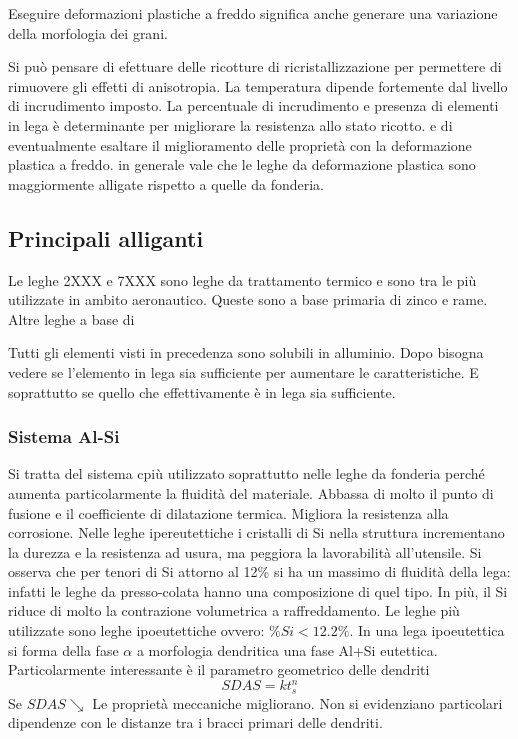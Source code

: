 
Eseguire deformazioni plastiche a freddo significa anche generare una variazione della morfologia dei grani.

Si può pensare di efettuare delle ricotture di ricristallizzazione per permettere di rimuovere gli effetti di anisotropia.
La temperatura dipende fortemente dal livello di incrudimento imposto.
La percentuale di incrudimento e presenza di elementi in lega è determinante per migliorare la resistenza allo stato ricotto. e di eventualmente esaltare il miglioramento delle proprietà con la deformazione plastica a freddo.
in generale vale che le leghe da deformazione plastica sono maggiormente alligate rispetto a quelle da fonderia.

\subsection{Principali alliganti}
Le leghe 2XXX e 7XXX sono leghe da trattamento termico e sono tra le più utilizzate in ambito aeronautico.
Queste sono a base primaria di zinco e rame.
Altre leghe a base di \todo{\\Aggiungi}

Tutti gli elementi visti in precedenza sono solubili in alluminio.
Dopo bisogna vedere se l'elemento in lega sia sufficiente per aumentare le caratteristiche. E soprattutto se quello che effettivamente è in lega sia sufficiente.

\subsubsection{Sistema Al-Si}
Si tratta del sistema cpiù utilizzato soprattutto nelle leghe da fonderia perché aumenta particolarmente la fluidità del materiale.
Abbassa di molto il punto di fusione e il coefficiente di dilatazione termica. Migliora la resistenza alla corrosione. Nelle leghe ipereutettiche i cristalli di Si nella struttura incrementano la durezza e la resistenza ad usura, ma peggiora la lavorabilità all'utensile.
Si osserva che per tenori di Si attorno al 12\% si ha un massimo di fluidità della lega: infatti le leghe da presso-colata hanno una composizione di quel tipo.
In più, il Si riduce di molto la contrazione volumetrica a raffreddamento. 
Le leghe più utilizzate sono leghe ipoeutettiche ovvero: $\%Si < 12.2\%$.
In una lega ipoeutettica si forma della fase $\alpha$ a morfologia dendritica una fase Al+Si eutettica.
Particolarmente interessante è il parametro geometrico delle dendriti
\begin{equation}
SDAS = k t_s^n
\end{equation}
Se $SDAS \searrow$ Le proprietà meccaniche migliorano.
Non si evidenziano particolari dipendenze con le distanze tra i bracci primari delle dendriti.

